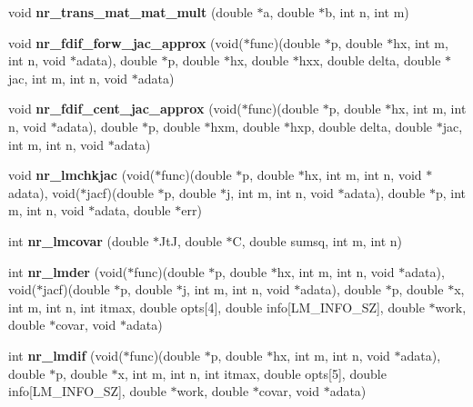 \begin{CompactItemize}
\item 
void \textbf{nr\_\-trans\_\-mat\_\-mat\_\-mult} (double $\ast$a, double $\ast$b, int n, int m)\label{group__nr_gb647cf24b2b6ab2a0dd993ba4021447c}

\item 
void \textbf{nr\_\-fdif\_\-forw\_\-jac\_\-approx} (void($\ast$func)(double $\ast$p, double $\ast$hx, int m, int n, void $\ast$adata), double $\ast$p, double $\ast$hx, double $\ast$hxx, double delta, double $\ast$jac, int m, int n, void $\ast$adata)\label{group__nr_gf20223185cc5c2a215cb6559231dd55b}

\item 
void \textbf{nr\_\-fdif\_\-cent\_\-jac\_\-approx} (void($\ast$func)(double $\ast$p, double $\ast$hx, int m, int n, void $\ast$adata), double $\ast$p, double $\ast$hxm, double $\ast$hxp, double delta, double $\ast$jac, int m, int n, void $\ast$adata)\label{group__nr_geab4b93cc9d2f74f4c1859204fc9e694}

\item 
void \textbf{nr\_\-lmchkjac} (void($\ast$func)(double $\ast$p, double $\ast$hx, int m, int n, void $\ast$adata), void($\ast$jacf)(double $\ast$p, double $\ast$j, int m, int n, void $\ast$adata), double $\ast$p, int m, int n, void $\ast$adata, double $\ast$err)\label{group__nr_gc0c5d8dc11fc35234e751fbc54a6a185}

\item 
int \textbf{nr\_\-lmcovar} (double $\ast$JtJ, double $\ast$C, double sumsq, int m, int n)\label{group__nr_g2e38d1d3a33b269e190fb0edd3fc3303}

\item 
int \textbf{nr\_\-lmder} (void($\ast$func)(double $\ast$p, double $\ast$hx, int m, int n, void $\ast$adata), void($\ast$jacf)(double $\ast$p, double $\ast$j, int m, int n, void $\ast$adata), double $\ast$p, double $\ast$x, int m, int n, int itmax, double opts[4], double info[LM\_\-INFO\_\-SZ], double $\ast$work, double $\ast$covar, void $\ast$adata)\label{nr__levmar_8c_4e3627752472ab793c8c484b1a69c87e}

\item 
int \textbf{nr\_\-lmdif} (void($\ast$func)(double $\ast$p, double $\ast$hx, int m, int n, void $\ast$adata), double $\ast$p, double $\ast$x, int m, int n, int itmax, double opts[5], double info[LM\_\-INFO\_\-SZ], double $\ast$work, double $\ast$covar, void $\ast$adata)\label{nr__levmar_8c_70e64815dc077832e55d0e97747f3a2d}


\end{CompactItemize}
